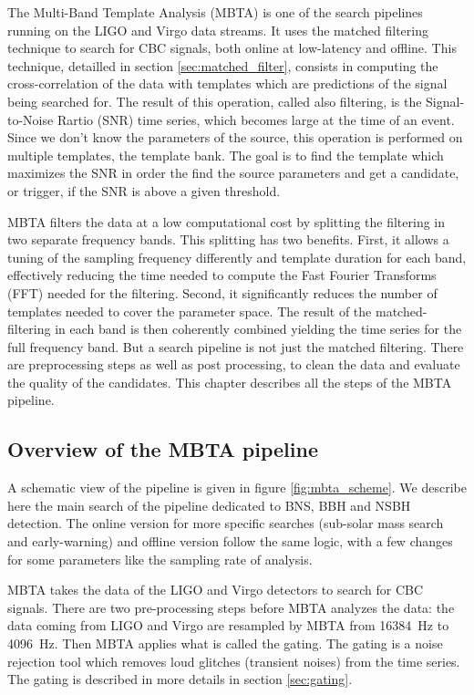 The Multi-Band Template Analysis (MBTA) is one of the search pipelines running on the LIGO and Virgo data streams.
It uses the matched filtering technique to search for CBC signals, both online at low-latency and offline.
This technique, detailled in section \ref{sec:matched_filter}, consists in computing the cross-correlation of the data with templates which are predictions of the signal being searched for.
The result of this operation, called also filtering, is the Signal-to-Noise Rartio (SNR) time series, which becomes large at the time of an event. 
Since we don't know the parameters of the source, this operation is performed on multiple templates, the template bank.
The goal is to find the template which maximizes the SNR in order the find the source parameters and get a candidate, or trigger, if the SNR is above a given threshold.

MBTA filters the data at a low computational cost by splitting the filtering in two separate frequency bands.
This splitting has two benefits.
First, it allows a tuning of the sampling frequency differently and template duration for each band, effectively reducing the time needed to compute the Fast Fourier Transforms (FFT) needed for the filtering.
Second, it significantly reduces the number of templates needed to cover the parameter space.
The result of the matched-filtering in each band is then coherently combined yielding the time series for the full frequency band.
But a search pipeline is not just the matched filtering. There are preprocessing steps as well as post processing, to clean the data and evaluate the quality of the candidates. This chapter describes all the steps of the MBTA pipeline.


\subsection{Overview of the MBTA pipeline}
\label{sec:MBTA}
A schematic view of the pipeline is given in figure \ref{fig:mbta_scheme}.
We describe here the main search of the pipeline dedicated to BNS, BBH and NSBH detection.
The online version for more specific searches (sub-solar mass search and early-warning) and offline version follow the same logic, with a few changes for some parameters like the sampling rate of analysis.

MBTA takes the data of the LIGO and Virgo detectors to search for CBC signals.
There are two pre-processing steps before MBTA analyzes the data: the data coming from LIGO and Virgo are resampled by MBTA from \SI{16384}{Hz} to \SI{4096}{Hz}.
Then MBTA applies what is called the gating.
The gating is a noise rejection tool which removes loud glitches (transient noises) from the time series.
The gating is described in more details in section \ref{sec:gating}.

